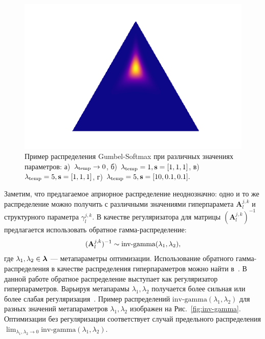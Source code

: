 \begin{figure}
\begin{minipage}[t]{.2\textwidth}
\subcaption{}
\end{minipage}
\hfill
 \begin{minipage}[t]{.2\textwidth}
   \includegraphics[width=\textwidth]{plots/notebooks/gs5_shift.png}
\subcaption{}
\end{minipage}

\caption{Пример распределения Gumbel-Softmax при различных значениях параметров: а)~$\lambda_{\text{temp}}\to0$, б)~$\lambda_{\text{temp}}=1, \mathbf{s}=[1,1,1]$, в)~$\lambda_{\text{temp}}=5, \mathbf{s}=[1,1,1]$, г)~$\lambda_{\text{temp}}=5, \mathbf{s}=[10,0.1,0.1].$}
\label{fig:gs}

\end{figure}


Заметим, что предлагаемое априорное распределение неоднозначно: одно и то же распределение  можно получить с различными значениями гиперпарамета $\mathbf{A}^{j,k}_l$ и структурного параметра $\gamma^{j,k}_l$. В качестве регуляризатора для матрицы $(\mathbf{A}^{j,k}_l)^{-1}$ предлагается использовать обратное гамма-распределение:
\[
    (\mathbf{A}^{j,k}_l)^{-1} \sim \text{inv-gamma}(\lambda_1,\lambda_2),
\]
где $\lambda_1,\lambda_2 \in \boldsymbol{\lambda}$ --- метапараметры оптимизации. 
Использование обратного гамма-распределения в качестве распределения гиперпараметров можно найти в~\cite{bishop,mackay}. В данной работе обратное распределение выступает как регуляризатор гиперпараметров.
Варьируя метапарамы $\lambda_1,\lambda_2$ получается  более сильная или более слабая регуляризация~\cite{rvm}. Пример распределений $\text{inv-gamma}(\lambda_1,\lambda_2)$ для разных значений метапараметров $\lambda_1,\lambda_2$ изображен на Рис.~\ref{fig:inv-gamma}. Оптимизации без регуляризации соответствует случай предельного распределения $\lim_{\lambda_1,\lambda_2\to 0}\text{inv-gamma}(\lambda_1, \lambda_2)$.

